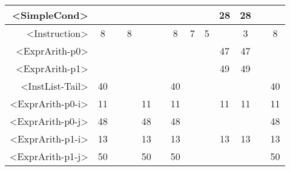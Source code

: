 \begin{tabular}{r|c@{ }c@{ }c@{ }c@{ }c@{ }c@{ }c@{ }c@{ }c@{ }c@{ }c@{ }c@{ }}
<SimpleCond> &   &   &   &   &   &   &   &   & 28 & 28 &   &   \\\hline
<Instruction> & 8 &   & 8 &   &   & 8 & 7 & 5 &   & 3 &   & 8 \\\hline
<ExprArith-p0> &   &   &   &   &   &   &   &   & 47 & 47 &   &   \\\hline
<ExprArith-p1> &   &   &   &   &   &   &   &   & 49 & 49 &   &   \\\hline
<InstList-Tail> & 40 &   &   &   &   & 40 &   &   &   &   &   & 40 \\\hline
<ExprArith-p0-i> & 11 &   &   & 11 &   & 11 &   &   & 11 & 11 &   & 11 \\\hline
<ExprArith-p0-j> & 48 &   &   & 48 &   & 48 &   &   &   &   &   & 48 \\\hline
<ExprArith-p1-i> & 13 &   &   & 13 &   & 13 &   &   & 13 & 13 &   & 13 \\\hline
<ExprArith-p1-j> & 50 &   &   & 50 &   & 50 &   &   &   &   &   & 50 \\\hline
\end{tabular}



